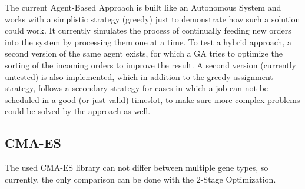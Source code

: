 \documentclass[a4paper,12pt,twoside]{scrreprt}
\begin{document}
\begin{flushleft}
The current Agent-Based Approach is built like an Autonomous System and works with a simplistic strategy (greedy) just to demonstrate how such a solution could work.
It currently simulates the process of continually feeding new orders into the system by processing them one at a time.
To test a hybrid approach, a second version of the same agent exists, for which a GA tries to optimize the sorting of the incoming orders to improve the result.
A second version (currently untested) is also implemented, which in addition to the greedy assignment strategy, follows a secondary strategy for cases in which a job can not be scheduled in a good (or just valid) timeslot, to make sure more complex problems could be solved by the approach as well.

\subsection{CMA-ES}
The used CMA-ES library can not differ between multiple gene types, so currently, the only comparison can be done with the 2-Stage Optimization.

\end{flushleft}
\end{document}
